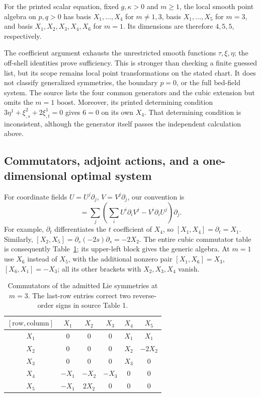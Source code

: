 \begin{proposition}
For the printed scalar equation, fixed $g,\kappa>0$ and $m\geq1$, the local
smooth point algebra on $p,q>0$ has basis $X_1,\ldots,X_4$ for $m\ne1,3$,
basis $X_1,\ldots,X_5$ for $m=3$, and basis $X_1,X_2,X_3,X_4,X_6$ for
$m=1$. Its dimensions are therefore $4,5,5$, respectively.
\end{proposition}
The coefficient argument exhausts the unrestricted smooth functions
$\tau,\xi,\eta$; the off-shell identities prove sufficiency. This is
stronger than checking a finite guessed list, but its scope remains local
point transformations on the stated chart. It does not classify generalized
symmetries, the boundary $p=0$, or the full bed-field system.
The source lists the four common generators and the cubic extension but
omits the $m=1$ boost. Moreover, its printed determining condition
$3\eta^1+\xi^2_{,s}+2\xi^1_{,t}=0$ gives $6=0$ on its own $X_4$.
That determining condition is inconsistent, although the generator itself
passes the independent calculation above.

\subsection{Commutators, adjoint actions, and a one-dimensional optimal system}
For coordinate fields $U=U^j\partial_j$, $V=V^j\partial_j$, our convention is
\begin{equation}
 [U,V]=\sum_j\left(\sum_i U^i\partial_iV^j
                          -V^i\partial_iU^j\right)\partial_j.
 \label{eq:sve-bracket-rule}
\end{equation}
For example, $\partial_t$ differentiates the $t$ coefficient of $X_4$,
so $[X_1,X_4]=\partial_t=X_1$. Similarly,
$[X_2,X_5]=\partial_s(-2s)\partial_s=-2X_2$.
The entire cubic commutator table is consequently
Table~\ref{tab:sve-repro-brackets}; its upper-left block gives the generic
algebra. At $m=1$ use $X_6$ instead of $X_5$, with the additional nonzero
pair $[X_1,X_6]=X_3$, $[X_6,X_1]=-X_3$; all its other brackets with
$X_2,X_3,X_4$ vanish.

\begin{table}[htbp]
\centering\small
\begin{tabular}{@{}c|ccccc@{}}
\toprule
$[\text{row},\text{column}]$ & $X_1$ & $X_2$ & $X_3$ & $X_4$ & $X_5$\\
\midrule
$X_1$ & $0$ & $0$ & $0$ & $X_1$ & $X_1$\\
$X_2$ & $0$ & $0$ & $0$ & $X_2$ & $-2X_2$\\
$X_3$ & $0$ & $0$ & $0$ & $X_3$ & $0$\\
$X_4$ & $-X_1$ & $-X_2$ & $-X_3$ & $0$ & $0$\\
$X_5$ & $-X_1$ & $2X_2$ & $0$ & $0$ & $0$\\
\bottomrule
\end{tabular}
\caption{Commutators of the admitted Lie symmetries at $m=3$.
The last-row entries correct two reverse-order signs in source Table 1.}
\label{tab:sve-repro-brackets}
\end{table}

